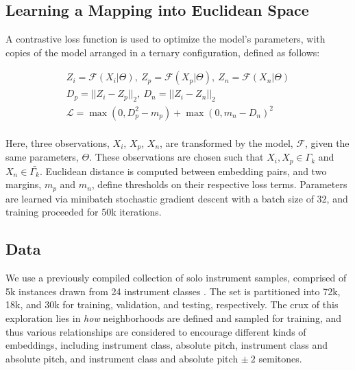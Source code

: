 \documentclass{article}
\begin{document}
\subsection{Learning a Mapping into Euclidean Space}

A contrastive loss function is used to optimize the model's parameters,
with copies of the model arranged in a ternary configuration, defined as follows:

\begin{align*}
Z_i = \mathcal{F}(X_i | \Theta),~Z_p = \mathcal{F}(X_p | \Theta),~Z_n = \mathcal{F}(X_n | \Theta)\\
D_p = || Z_i - Z_p ||_2,~D_n = || Z_i - Z_n ||_2\\
\mathcal{L} = \max(0, D_p^2 - m_{p}) + \max(0, m_{n} - D_n)^2 \\
\end{align*}

Here, three observations, $X_i$, $X_p$, $X_n$, are transformed by the model, $\mathcal{F}$, given the same parameters, $\Theta$.
These observations are chosen such that $X_i, X_p \in \Gamma_k$ and $X_n \in \bar{\Gamma_k}$.
Euclidean distance is computed between embedding pairs, and two margins, $m_p$ and $m_n$, define thresholds on their respective loss terms.
Parameters are learned via minibatch stochastic gradient descent with a batch size of 32, and training proceeded for 50k iterations.

\subsection{Data}

We use a previously compiled collection of solo instrument samples, comprised of 5k instances drawn from 24 instrument classes \cite{humphrey2015dl4mir}.
The set is partitioned into 72k, 18k, and 30k for training, validation, and testing, respectively.
The crux of this exploration lies in \emph{how} neighborhoods are defined and sampled for training, and thus various relationships are considered to encourage different kinds of embeddings, including instrument class, absolute pitch, instrument class and absolute pitch, and instrument class and absolute pitch $\pm~2$ semitones.
\end{document}
